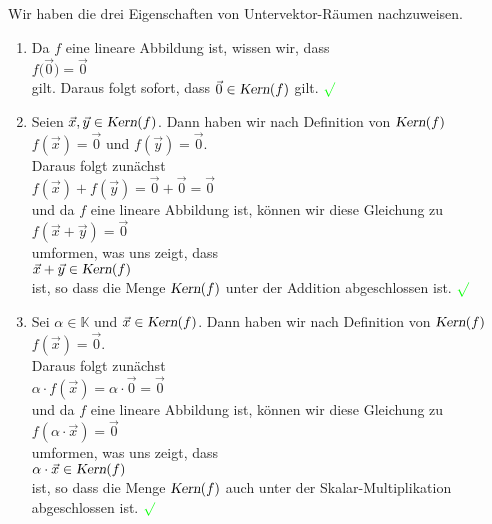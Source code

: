 \proof
Wir haben die drei Eigenschaften von Untervektor-R\"{a}umen nachzuweisen. 
\begin{enumerate}
\item Da $f$ eine lineare Abbildung ist, wissen wir, dass
      \\[0.2cm]
      \hspace*{1.3cm}
      $f\bigl(\vec{0}\bigr) = \vec{0}$
      \\[0.2cm]
      gilt.  Daraus folgt sofort, dass $\vec{0} \in \textsl{Kern}(f)$ gilt. ${\color{green}\surd}$ 
\item Seien $\vec{x}, \vec{y} \in \textsl{Kern}(f)$.  Dann haben wir nach Definition von $\textsl{Kern}(f)$
      \\[0.2cm]
      \hspace*{1.3cm}
      $f(\vec{x}) = \vec{0}$ \quad und \quad $f(\vec{y}) = \vec{0}$. 
      \\[0.2cm]
      Daraus folgt zun\"{a}chst
      \\[0.2cm]
      \hspace*{1.3cm}
      $f(\vec{x}) + f(\vec{y}) = \vec{0} + \vec{0} = \vec{0}$
      \\[0.2cm]
      und da $f$ eine lineare Abbildung ist, k\"{o}nnen wir diese Gleichung zu
      \\[0.2cm]
      \hspace*{1.3cm}
      $f(\vec{x} + \vec{y}) = \vec{0}$
      \\[0.2cm]
      umformen, was uns zeigt, dass
      \\[0.2cm]
      \hspace*{1.3cm}
      $\vec{x} + \vec{y} \in \textsl{Kern}(f)$ 
      \\[0.2cm]
      ist, so dass die Menge $\textsl{Kern}(f)$ unter der Addition abgeschlossen ist. ${\color{green}\surd}$
\item Sei $\alpha \in \mathbb{K}$ und $\vec{x} \in \textsl{Kern}(f)$.  Dann haben wir nach Definition von $\textsl{Kern}(f)$
      \\[0.2cm]
      \hspace*{1.3cm}
      $f(\vec{x}) = \vec{0}$. 
      \\[0.2cm]
      Daraus folgt zun\"{a}chst
      \\[0.2cm]
      \hspace*{1.3cm}
      $\alpha \cdot f(\vec{x}) = \alpha \cdot \vec{0} = \vec{0}$
      \\[0.2cm]
      und da $f$ eine lineare Abbildung ist, k\"{o}nnen wir diese Gleichung zu
      \\[0.2cm]
      \hspace*{1.3cm}
      $f(\alpha \cdot \vec{x}) = \vec{0}$
      \\[0.2cm]
      umformen, was uns zeigt, dass
      \\[0.2cm]
      \hspace*{1.3cm}
      $\alpha \cdot \vec{x} \in \textsl{Kern}(f)$ 
      \\[0.2cm]
      ist, so dass die Menge $\textsl{Kern}(f)$ auch unter der Skalar-Multiplikation abgeschlossen ist. ${\color{green}\surd}$
      \qeds
\end{enumerate}

